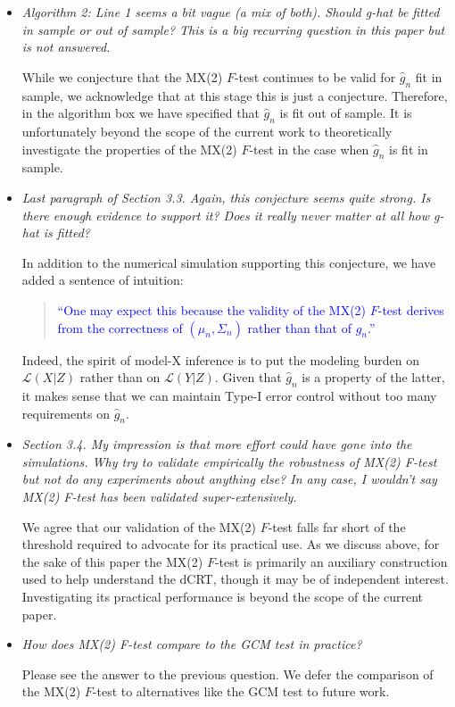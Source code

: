 \documentclass[12pt]{article}
\begin{document}
\begin{itemize}
	
	\item \textsl{Algorithm 2: Line 1 seems a bit vague (a mix of both). Should g-hat be fitted in sample or out of sample? This is a big recurring question in this paper but is not answered.}
	
	While we conjecture that the MX(2) $F$-test continues to be valid for $\widehat g_n$ fit in sample, we acknowledge that at this stage this is just a conjecture. Therefore, in the algorithm box we have specified that $\widehat g_n$ is fit out of sample. It is unfortunately beyond the scope of the current work to theoretically investigate the properties of the MX(2) $F$-test in the case when $\widehat g_n$ is fit in sample.

	\item \textsl{Last paragraph of Section 3.3. Again, this conjecture seems quite strong. Is there enough evidence to support it? Does it really never matter at all how g-hat is fitted?}
	
	In addition to the numerical simulation supporting this conjecture, we have added a sentence of intuition:

	\begin{quote}
		\textcolor{blue}{``One may expect this because the validity of the MX(2) $F$-test derives from the correctness of $(\mu_n, \Sigma_n)$ rather than that of $\widehat g_n$.''}
	\end{quote}

	Indeed, the spirit of model-X inference is to put the modeling burden on $\mathcal L(X|Z)$ rather than on $\mathcal L(Y|Z)$. Given that $\widehat g_n$ is a property of the latter, it makes sense that we can maintain Type-I error control without too many requirements on $\widehat g_n$.

	\item \textsl{Section 3.4. My impression is that more effort could have gone into the simulations. Why try to validate empirically the robustness of MX(2) F-test but not do any experiments about anything else? In any case, I wouldn’t say MX(2) F-test has been validated super-extensively.}
	
	We agree that our validation of the MX(2) $F$-test falls far short of the threshold required to advocate for its practical use. As we discuss above, for the sake of this paper the MX(2) $F$-test is primarily an auxiliary construction used to help understand the dCRT, though it may be of independent interest. Investigating its practical performance is beyond the scope of the current paper.

	\item \textsl{How does MX(2) F-test compare to the GCM test in practice?}
	
	Please see the answer to the previous question. We defer the comparison of the MX(2) $F$-test to alternatives like the GCM test to future work.

\end{itemize}
\end{document}
